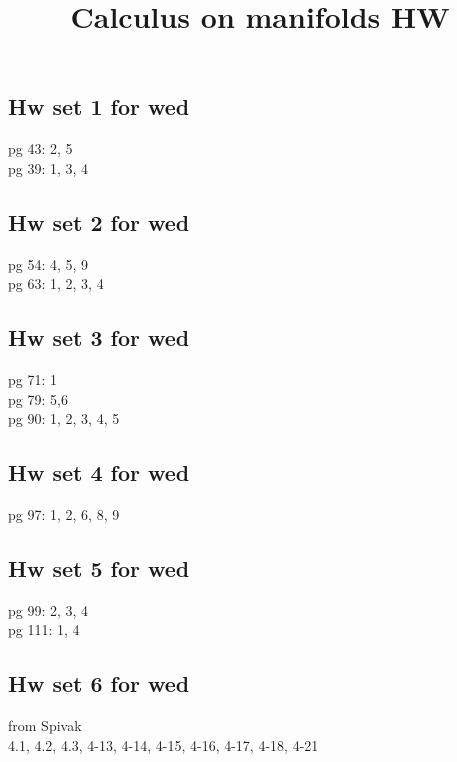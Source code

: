 \documentclass{amsart}
\numberwithin{equation}{section}
\theoremstyle{definition}
\theoremstyle{remark}
\begin{document}
\title{Calculus on manifolds HW}
\maketitle
\subsection*{Hw set 1 for wed}
pg 43: 2, 5 \\
pg 39: 1, 3, 4
\subsection*{Hw set 2 for wed}
pg 54: 4, 5, 9 \\
pg 63: 1, 2, 3, 4
\subsection*{Hw set 3 for wed}
pg 71: 1 \\
pg 79: 5,6 \\
pg 90: 1, 2, 3, 4, 5 
\subsection*{Hw set 4 for wed}
pg 97: 1, 2, 6, 8, 9
\subsection*{Hw set 5 for wed}
pg 99: 2, 3, 4 \\
pg 111: 1, 4
\subsection*{Hw set 6 for wed}
from Spivak \\
4.1, 4.2, 4.3, 4-13, 4-14, 4-15, 4-16, 4-17, 4-18, 4-21

\end{document}
